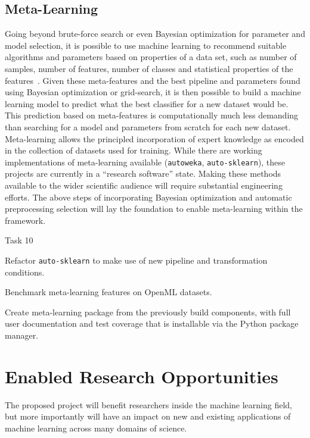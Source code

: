 \subsection{Meta-Learning}
Going beyond brute-force search or even Bayesian optimization for parameter and
model selection, it is possible to use machine learning to recommend suitable
algorithms and parameters based on properties of a data set, such as number of
samples, number of features, number of classes and statistical properties of
the features~\autocite{luo2015review, feurer-nips2015}.
Given these meta-features and the best pipeline and parameters found using
Bayesian optimization or grid-search, it is then possible to build a machine
learning model to predict what the best classifier for a new dataset would be.
This prediction based on meta-features is computationally much less demanding
than searching for a model and parameters from scratch for each new dataset.
Meta-learning allows the principled incorporation of expert knowledge as encoded
in the collection of datasets used for training.
While there are working implementations of meta-learning available
(\texttt{autoweka}, \texttt{auto-sklearn}),
these projects are currently in a ``research software'' state. Making these methods
available to the wider scientific audience will require substantial engineering
efforts. The above steps of incorporating Bayesian optimization and automatic
preprocessing selection will lay the foundation to enable meta-learning within the
\sklearn{} framework.
\begin{labeling}{Task 10}
    \item [Task 10] Refactor \texttt{auto-sklearn} to make use of new pipeline and transformation conditions.
    \item [Task 11] Benchmark meta-learning features on OpenML datasets.
    \item [Task 12] Create meta-learning package from the previously build
        components, with full user documentation and test coverage that is
        installable via the Python package manager.
\end{labeling}

\section{Enabled Research Opportunities}
The proposed project will benefit researchers inside the machine learning field,
but more importantly will have an impact on new and existing applications of machine
learning across many domains of science.

